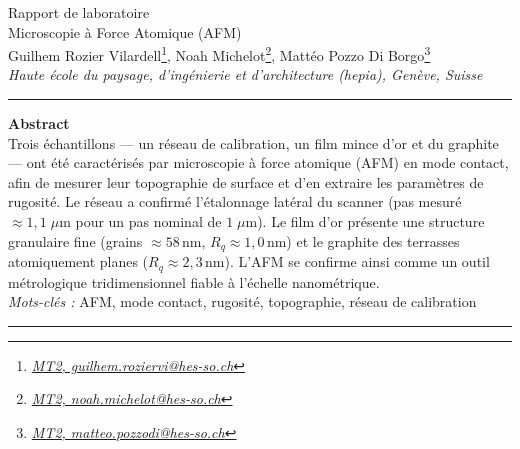 \documentclass[a4paper,10pt]{article}
\begin{document}

\begin{center}
\vspace*{0mm}
{\large
Rapport de laboratoire\\
\vspace{3mm}
Microscopie à Force Atomique (AFM)
}\\
\vspace{8mm}
Guilhem Rozier Vilardell\footnote{\textit{\href{mailto:guilhem.roziervi@hes-so.ch}{MT2, guilhem.roziervi@hes-so.ch}}},
Noah Michelot\footnote{\textit{\href{mailto:noah.michelot@hes-so.ch}{MT2, noah.michelot@hes-so.ch}}},
Mattéo Pozzo Di Borgo\footnote{\textit{\href{mailto:matteo.pozzodi@hes-so.ch}{MT2, matteo.pozzodi@hes-so.ch}}}
%
\vspace{3mm}\\
\footnotesize{
\textit{Haute école du paysage, d'ingénierie et d'architecture (hepia), Genève, Suisse}
}\\
\vspace{9mm}
\end{center}
%
\rule{\linewidth}{0.4pt} %
\onehalfspacing
\textbf{Abstract}\\
Trois échantillons --- un réseau de calibration, un film mince d'or et du graphite ---
ont été caractérisés par microscopie à force atomique (AFM) en mode contact, afin de
mesurer leur topographie de surface et d'en extraire les paramètres de rugosité. Le
réseau a confirmé l'étalonnage latéral du scanner (pas mesuré $\approx 1{,}1\;\mu$m
pour un pas nominal de $1\;\mu$m). Le film d'or présente une structure granulaire fine
(grains $\approx 58$\,nm, $R_q\approx1{,}0$\,nm) et le graphite des terrasses
atomiquement planes ($R_q\approx2{,}3$\,nm). L'AFM se confirme ainsi comme un outil
métrologique tridimensionnel fiable à l'échelle nanométrique.\\
\noindent\textit{Mots-clés :} AFM, mode contact, rugosité, topographie, réseau de calibration\\
\rule{\linewidth}{0.4pt} %

\singlespacing

\tableofcontents

\printnomenclature

\setlength{\parskip}{1pt} %
\pagebreak
\end{document}
